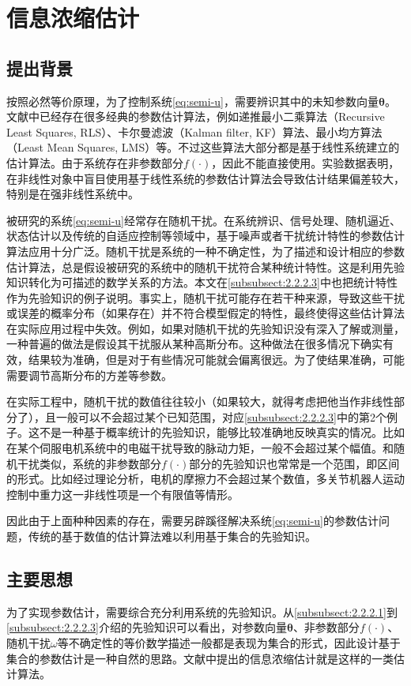 \section{信息浓缩估计}\label{sect:2.3}
\subsection{提出背景}\label{subsect:2.3.1}
按照必然等价原理，为了控制系统\eqref{eq:semi-u}，需要辨识其中的未知参数向量$\bm{\theta}$。文献中已经存在很多经典的参数估计算法，例如递推最小二乘算法（Recursive Least Squares, RLS）、卡尔曼滤波（Kalman filter, KF）算法、最小均方算法（Least Mean Squares, LMS）等。不过这些算法大部分都是基于线性系统建立的估计算法。由于系统存在非参数部分$f(\cdot)$，因此不能直接使用。实验数据表明，在非线性对象中盲目使用基于线性系统的参数估计算法会导致估计结果偏差较大，特别是在强非线性系统中。

被研究的系统\eqref{eq:semi-u}经常存在随机干扰。在系统辨识、信号处理、随机逼近、状态估计以及传统的自适应控制等领域中，基于噪声或者干扰统计特性的参数估计算法应用十分广泛。随机干扰是系统的一种不确定性，为了描述和设计相应的参数估计算法，总是假设被研究的系统中的随机干扰符合某种统计特性。这是利用先验知识转化为可描述的数学关系的方法。本文在\ref{subsubsect:2.2.2.3}中也把统计特性作为先验知识的例子说明。事实上，随机干扰可能存在若干种来源，导致这些干扰或误差的概率分布（如果存在）并不符合模型假定的特性，最终使得这些估计算法在实际应用过程中失效。例如，如果对随机干扰的先验知识没有深入了解或测量，一种普遍的做法是假设其干扰服从某种高斯分布。这种做法在很多情况下确实有效，结果较为准确，但是对于有些情况可能就会偏离很远。为了使结果准确，可能需要调节高斯分布的方差等参数。

在实际工程中，随机干扰的数值往往较小（如果较大，就得考虑把他当作非线性部分了），且一般可以不会超过某个已知范围，对应\ref{subsubsect:2.2.2.3}中的第2个例子。这不是一种基于概率统计的先验知识，能够比较准确地反映真实的情况。比如在某个伺服电机系统中的电磁干扰导致的脉动力矩，一般不会超过某个幅值。和随机干扰类似，系统的非参数部分$f(\cdot)$部分的先验知识也常常是一个范围，即区间的形式。比如经过理论分析，电机的摩擦力不会超过某个数值，多关节机器人运动控制中重力这一非线性项是一个有限值等情形。

因此由于上面种种因素的存在，需要另辟蹊径解决系统\eqref{eq:semi-u}的参数估计问题，传统的基于数值的估计算法难以利用基于集合的先验知识。
\subsection{主要思想}\label{subsect:2.3.2}
为了实现参数估计，需要综合充分利用系统的先验知识。从\ref{subsubsect:2.2.2.1}到\ref{subsubsect:2.2.2.3}介绍的先验知识可以看出，对参数向量$\bm{\theta}$、非参数部分$f(\cdot)$、随机干扰$\omega$等不确定性的等价数学描述一般都是表现为集合的形式，因此设计基于集合的参数估计是一种自然的思路。文献\cite{MaLum2009}中提出的信息浓缩估计就是这样的一类估计算法。

